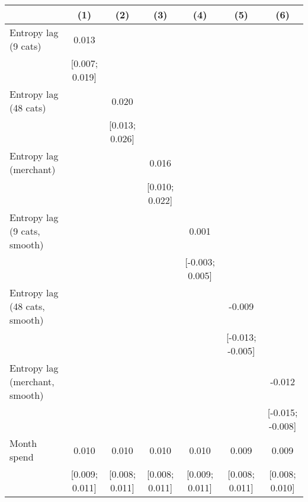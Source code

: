 
\begingroup
\centering
\begin{tabular}{lcccccc}
   \toprule
                                  & (1)            & (2)            & (3)            & (4)             & (5)              & (6)\\  
   \midrule 
   Entropy lag (9 cats)           & 0.013          &                &                &                 &                  &   \\   
                                  & [0.007; 0.019] &                &                &                 &                  &   \\   
   Entropy lag (48 cats)          &                & 0.020          &                &                 &                  &   \\   
                                  &                & [0.013; 0.026] &                &                 &                  &   \\   
   Entropy lag (merchant)         &                &                & 0.016          &                 &                  &   \\   
                                  &                &                & [0.010; 0.022] &                 &                  &   \\   
   Entropy lag (9 cats, smooth)   &                &                &                & 0.001           &                  &   \\   
                                  &                &                &                & [-0.003; 0.005] &                  &   \\   
   Entropy lag (48 cats, smooth)  &                &                &                &                 & -0.009           &   \\   
                                  &                &                &                &                 & [-0.013; -0.005] &   \\   
   Entropy lag (merchant, smooth) &                &                &                &                 &                  & -0.012\\   
                                  &                &                &                &                 &                  & [-0.015; -0.008]\\   
   Month spend                    & 0.010          & 0.010          & 0.010          & 0.010           & 0.009            & 0.009\\   
                                  & [0.009; 0.011] & [0.008; 0.011] & [0.008; 0.011] & [0.009; 0.011]  & [0.008; 0.011]   & [0.008; 0.010]\\   

\end{tabular}
